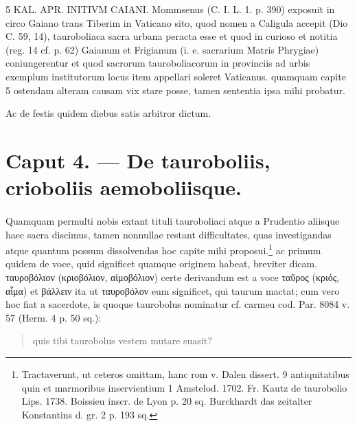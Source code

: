 \documentclass[a4paper, 11pt, oneside, polutonikogreek, german, twocolumn]{article}
\begin{document}
5 KAL. APR. INITIVM CAIANI. Mommsenus (C. I. L. 1. p. 390) exposuit in circo Gaiano trans Tiberim in Vaticano sito, quod nomen a Caligula accepit (Dio C. 59, 14), tauroboliaca sacra urbana peracta esse et quod in curioso et notitia (reg. 14 cf. p. 62) Gaianum et Frigianum (i. e. sacrarium Matris Phrygiae) coniungerentur et quod sacrorum tauroboliacorum in provinciis ad urbis exemplum institutorum locus item appellari soleret Vaticanus. quamquam capite 5 ostendam alteram causam vix stare posse, tamen sententia ipsa mihi probatur.

Ac de festis quidem diebus satis arbitror dictum.
\clearpage
\section{Caput 4. --- De tauroboliis, crioboliis aemoboliisque.}
\paragraph{}
Quamquam permulti nobis extant tituli tauroboliaci atque a Prudentio aliisque haec sacra discimus, tamen nonnullae restant difficultates, quas investigandas atque quantum possum dissolvendas hoc capite mihi proposui.\footnote{Tractaverunt, ut ceteros omittam, hanc rom v. Dalen dissert. 9 antiquitatibus quin et marmoribus inservientium 1 Amstelod. 1702. Fr. Kautz de taurobolio Lips. 1738. Boissieu inscr. de Lyon p. 20 sq. Burckhardt das zeitalter Konstantins d. gr. 2 p. 193 sq.} ac primum quidem de voce, quid significet quamque originem habeat, breviter dicam. ταυροβόλιον (κριοβόλιον, αἱμοβόλιον) certe derivandum est a voce ταῦρος (κριός, αἷμα) et βάλλειν ita ut ταυροβόλον eum significet, qui taurum mactat; cum vero hoc fiat a sacerdote, is quoque taurobolus nominatur cf. carmeu cod. Par. 8084 v. 57 (Herm. 4 p. 50 sq.):
\begin{quotation}
quis tibi taurobolus vestem mutare suasit?
\end{quotation}
\end{document}
